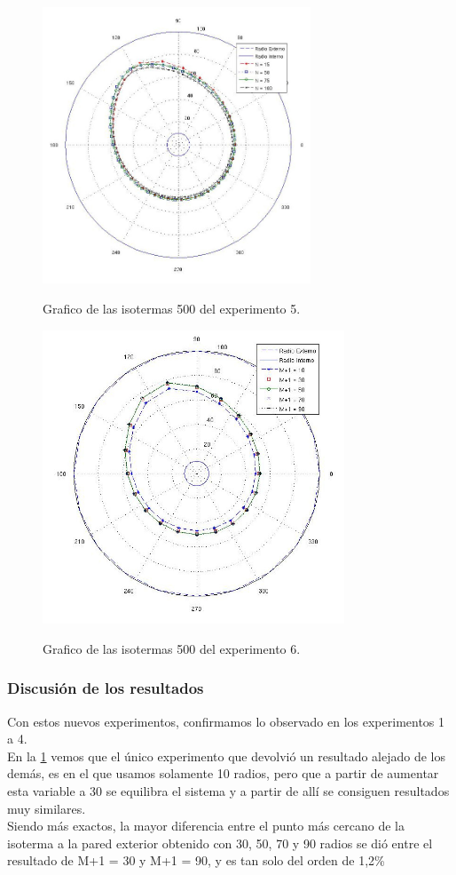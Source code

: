 \documentclass[12pt,a4paper]{article}
\begin{document}
\begin{figure}[h!]
\centering
\caption{Grafico de las isotermas 500 del experimento 5.}
\includegraphics[width=8cm]{compare20N.jpg}
\label{Exp5Biso}
\end{figure}

\begin{figure}[h!]
\centering
\caption{Grafico de las isotermas 500 del experimento 6.}
\includegraphics[width=9cm]{compareM20.jpg}
\label{Exp6Biso}
\end{figure}

\subsubsection{Discusión de los resultados}
Con estos nuevos experimentos, confirmamos lo observado en los experimentos 1 a 4. \\
En la \ref{Exp5Biso} vemos que el único experimento que devolvió un resultado alejado de los demás, es en el que usamos solamente 10 radios, pero que a partir de aumentar esta variable a 30 se equilibra el sistema y a partir de allí se consiguen resultados muy similares. \\
Siendo más exactos, la mayor diferencia entre el punto más cercano de la isoterma a la pared exterior obtenido con 30, 50, 70 y 90 radios se dió entre el resultado de M+1 = 30 y M+1 = 90, y es tan solo del orden de 1,2\% \\
\end{document}
